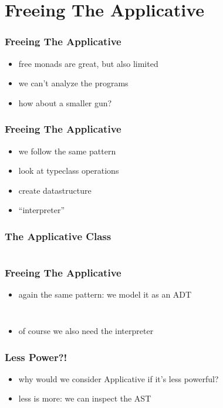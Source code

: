 \documentclass{beamer}
\begin{document}
\section{Freeing The Applicative}\label{sec:free-applicative}

\begin{frame}
  \frametitle{Freeing The Applicative}
  \begin{itemize}
  \item free monads are great, but also limited
  \item we can't analyze the programs
  \item how about a smaller gun?
  \end{itemize}
\end{frame}

\begin{frame}
  \frametitle{Freeing The Applicative}
  \begin{itemize}
  \item we follow the same pattern
  \item look at typeclass operations
  \item create datastructure
  \item ``interpreter''
  \end{itemize}
\end{frame}

\begin{frame}[fragile]
  \frametitle{The Applicative Class}
  \inputminted{scala}{snippets/applicative-typeclass.scala}
\end{frame}

\begin{frame}[fragile]
  \frametitle{Freeing The Applicative}
  \begin{itemize}
  \item again the same pattern: we model it as an ADT
  \end{itemize}
    \inputminted{scala}{snippets/free-applicative.scala}
  \begin{verbatim}
\end{verbatim}
\begin{itemize}
\item of course we also need the interpreter
\end{itemize}
\end{frame}

\begin{frame}
  \frametitle{Less Power?!}
  \begin{itemize}
  \item why would we consider Applicative if it's less powerful?
  \item less is more: we can inspect the AST
  \end{itemize}
\end{frame}
\end{document}
